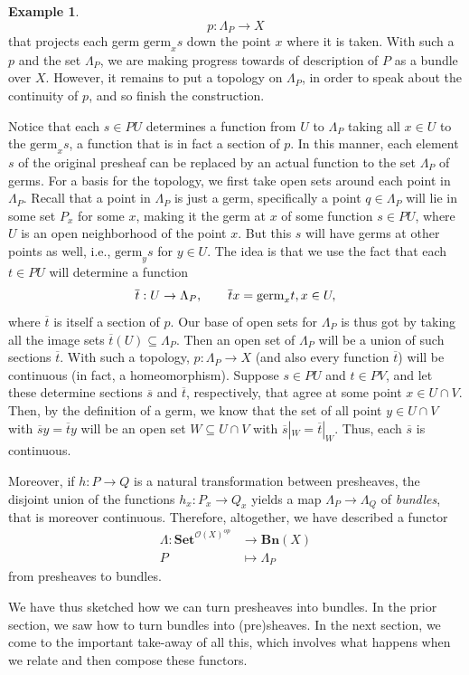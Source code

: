 \documentclass[a4paper]{book}
\theoremstyle{definition}
\newtheorem{example}{Example}[section]
\theoremstyle{definition}
\theoremstyle{definition}
\theoremstyle{theorem}
\theoremstyle{definition}
\begin{document}
\begin{example}
	\begin{equation*}
	p: \Lambda_P \rightarrow X
	\end{equation*}
	that projects each germ $\text{germ}_x s$ down the point $x$ where it is taken. With such a $p$ and the set $\Lambda_P$, we are making progress towards of description of $P$ as a bundle over $X$. However, it remains to put a topology on $\Lambda_P$, in order to speak about the continuity of $p$, and so finish the construction. \par 
	Notice that each $s \in PU$ determines a function from $U$ to $\Lambda_P$ taking all $x \in U$ to the $\text{germ}_x s$, a function that is in fact a section of $p$. In this manner, each element $s$ of the original presheaf can be replaced by an actual function to the set $\Lambda_P$ of germs. For a basis for the topology, we first take open sets around each point in $\Lambda_P$. Recall that a point in $\Lambda_P$ is just a germ, specifically a point $q \in \Lambda_P$ will lie in some set $P_x$ for some $x$, making it the germ at $x$ of some function $s \in PU$, where $U$ is an open neighborhood of the point $x$. But this $s$ will have germs at other points as well, i.e., $\text{germ}_y s$ for $y \in U$. The idea is that we use the fact that each $t \in PU$ will determine a function 
	\begin{equation*}
	\overline{t}: U \rightarrow \Lambda_P, \hspace*{2em} \overline{t}x = \text{germ}_x t, x \in U,
	\end{equation*}
	where $\overline{t}$ is itself a section of $p$.
	Our base of open sets for $\Lambda_P$ is thus got by taking all the image sets $\overline{t}(U) \subseteq  \Lambda_P$. Then an open set of $\Lambda_P$ will be a union of such sections $\overline{t}$. With such a topology, $p: \Lambda_P \rightarrow X$ (and also every function $\overline{t}$) will be continuous (in fact, a homeomorphism). Suppose $s \in PU$ and $t \in PV$, and let these determine sections $\overline{s}$ and $\overline{t}$, respectively, that agree at some point $x \in U \cap V$. Then, by the definition of a germ, we know that the set of all point $y \in U \cap V$ with $\overline{s}y = \overline{t}y$ will be an open set $W \subseteq  U \cap V$ with $\overline{s}|_W = \overline{t}|_W$. Thus, each $\overline{s}$ is continuous. \par 
	Moreover, if $h: P \rightarrow Q$ is a natural transformation between presheaves, the disjoint union of the functions $h_x: P_x \rightarrow Q_x$ yields a map $\Lambda_P \rightarrow \Lambda_Q$ of \textit{bundles}, that is moreover continuous. Therefore, altogether, we have described a functor 
	\begin{align*}
	\Lambda: \textbf{Set}^{\mathscr{O}(X)^{op}} & \rightarrow \textbf{Bn}(X) \\ 
	P & \mapsto \Lambda_P 
	\end{align*}
	from presheaves to bundles.\par 
	We have thus sketched how we can turn presheaves into bundles. In the prior section, we saw how to turn bundles into (pre)sheaves. In the next section, we come to the important take-away of all this, which involves what happens when we relate and then compose these functors. 

\end{example}
\end{document}

